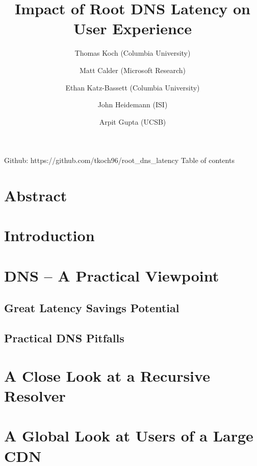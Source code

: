 \documentclass[sigconf,nonacm,10pt]{acmart}
\title{Impact of Root DNS Latency on User Experience}
\author{
            Thomas Koch (Columbia University)
         \and 
            Matt Calder (Microsoft Research)
         \and 
            Ethan Katz-Bassett (Columbia University)
         \and 
            John Heidemann (ISI)
         \and 
            Arpit Gupta (UCSB)
        }
\date{}
\begin{document}
\maketitle

\iffalse

Github: https://github.com/tkoch96/root\_dns\_latency Table of contents

\section*{Abstract}\label{abstract}

\section{Introduction}\label{introduction}

\section{DNS -- A Practical Viewpoint}\label{dns-a-practical-viewpoint}

\subsection{Great Latency Savings
Potential}\label{great-latency-savings-potential}

\subsection{Practical DNS Pitfalls}\label{practical-dns-pitfalls}

\section{A Close Look at a Recursive
Resolver}\label{a-close-look-at-a-recursive-resolver}

\section{A Global Look at Users of a Large
CDN}\label{a-global-look-at-users-of-a-large-cdn}
\end{document}
